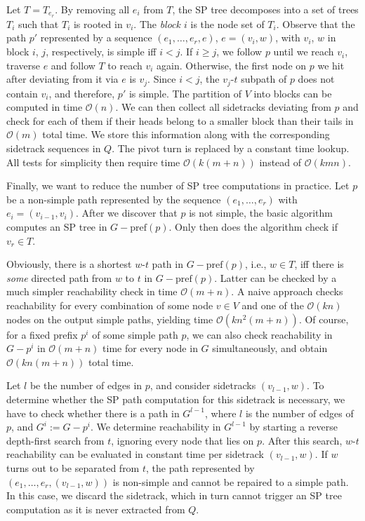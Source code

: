 \documentclass[runningheads,a4paper]{llncs}
\newcommand{\pref}{\text{pref}}
\begin{document}
Let $T = T_{e_r}$.
By removing all $e_i$ from $T$, the SP tree decomposes into a set of trees $T_i$ such that $T_i$ is rooted in $v_i$.
The \emph{block $i$} is the node set of $T_i$.
Observe that the path $p'$ represented by a sequence $(e_1, \ldots, e_r, e)$, $e = (v_i, w)$, with $v_i$, $w$ in block $i$, $j$, respectively, is simple iff $i < j$.
If $i \ge j$, we follow $p$ until we reach $v_i$, traverse $e$ and follow $T$ to reach $v_i$ again.
Otherwise, the first node on $p$ we hit after deviating from it via $e$ is $v_j$.
Since $i < j$, the $v_j$-$t$ subpath of $p$ does not contain $v_i$, and therefore, $p'$ is simple.
The partition of $V$ into blocks can be computed in time $\mathcal O(n)$.
We can then collect all sidetracks deviating from $p$ and check for each of them if their heads belong to a smaller block than their tails in $\mathcal O(m)$ total time.
We store this information along with the corresponding sidetrack sequences in $Q$.
The pivot turn is replaced by a constant time lookup.
All tests for simplicity then require time $\mathcal O(k(m + n))$ instead of $\mathcal O(kmn)$.

Finally, we want to reduce the number of SP tree computations in practice.
Let $p$ be a non-simple path represented by the sequence $(e_1, \ldots, e_r)$ with $e_i = (v_{i - 1}, v_i)$.
After we discover that $p$ is not simple, the basic algorithm computes an SP tree in $G - \pref(p)$.
Only then does the algorithm check if $v_r \in T$.

Obviously, there is a shortest $w$-$t$ path in $G - \pref(p)$, i.e., $w \in T$, iff there is \emph{some} directed path from $w$ to $t$ in $G - \pref(p)$.
Latter can be checked by a much simpler reachability check in time $\mathcal O(m + n)$.
A naive approach checks reachability for every combination of some node $v \in V$ and one of the $\mathcal O(kn)$ nodes on the output simple paths, yielding time $\mathcal O(kn^2(m + n))$.
Of course, for a fixed prefix $p^i$ of some simple path $p$, we can also check reachability in $G - p^i$ in $\mathcal O(m + n)$ time for every node in $G$ simultaneously, and obtain $\mathcal O(kn(m + n))$ total time.

Let $l$ be the number of edges in $p$, and consider sidetracks $(v_{l - 1}, w)$.
To determine whether the SP path computation for this sidetrack is necessary, we have to check whether there is a path in $G^{l - 1}$, where $l$ is the number of edges of $p$, and $G^i := G - p^i$.
We determine reachability in $G^{l - 1}$ by starting a reverse depth-first search from $t$, ignoring every node that lies on $p$.
After this search, $w$-$t$ reachability can be evaluated in constant time per sidetrack $(v_{l - 1}, w)$.
If $w$ turns out to be separated from $t$, the path represented by $(e_1, \ldots, e_r, (v_{l - 1}, w))$ is non-simple and cannot be repaired to a simple path.
In this case, we discard the sidetrack, which in turn cannot trigger an SP tree computation as it is never extracted from $Q$.
\end{document}
